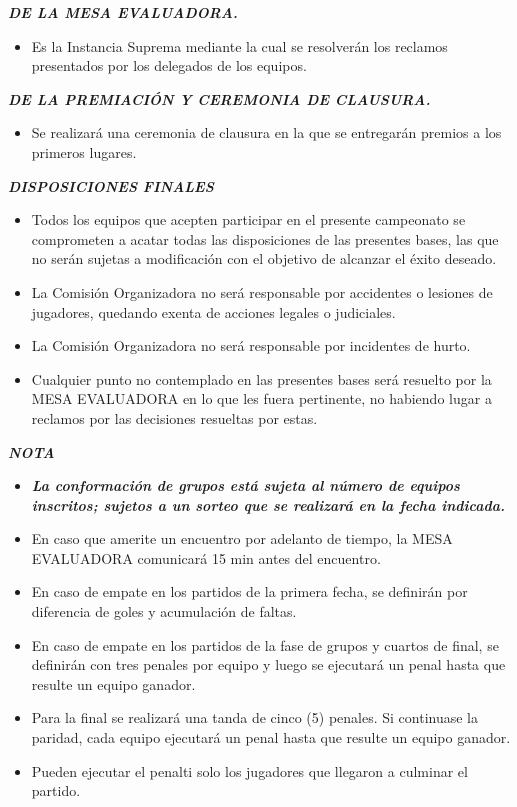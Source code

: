 \documentclass[11pt,a4paper]{article}
\newcommand{\titulo}[1]{\par\medskip\textbf{\textit{#1}}\par}
\begin{document}
\titulo{DE LA MESA EVALUADORA.}
\begin{itemize}
	\item Es la Instancia Suprema mediante la cual se resolverán los reclamos presentados por los delegados de los equipos.
\end{itemize}

\titulo{DE LA PREMIACIÓN Y CEREMONIA DE CLAUSURA.}
\begin{itemize}
	\item Se realizará una ceremonia de clausura en la que se entregarán premios a los primeros lugares.
\end{itemize}

\titulo{DISPOSICIONES FINALES}
\begin{itemize}
	\item Todos los equipos que acepten participar en el presente campeonato se comprometen a acatar todas las disposiciones de las presentes bases, las que no serán sujetas a modificación con el objetivo de alcanzar el éxito deseado.
	\item La Comisión Organizadora no será responsable por accidentes o lesiones de jugadores, quedando exenta de acciones legales o judiciales.
	\item La Comisión Organizadora no será responsable por incidentes de hurto.
	\item Cualquier punto no contemplado en las presentes bases será resuelto por la MESA EVALUADORA en lo que les fuera pertinente, no habiendo lugar a reclamos por las decisiones resueltas por estas.
\end{itemize}

\titulo{NOTA}
\begin{itemize}
	\item \textbf{\textit{La conformación de grupos está sujeta al número de equipos inscritos; sujetos a un sorteo que se realizará en la fecha indicada.}}
	\item En caso que amerite un encuentro por adelanto de tiempo, la MESA EVALUADORA comunicará 15 min antes del encuentro.
	\item En caso de empate en los partidos de la primera fecha, se definirán por diferencia de goles y acumulación de faltas.
	\item En caso de empate en los partidos de la fase de grupos y cuartos de final, se definirán con tres penales por equipo y luego se ejecutará un penal hasta que resulte un equipo ganador.
	\item Para la final se realizará una tanda de cinco (5) penales. Si continuase la paridad, cada equipo ejecutará un penal hasta que resulte un equipo ganador.
	\item Pueden ejecutar el penalti solo los jugadores que llegaron a culminar el partido.
\end{itemize}
\end{document}
